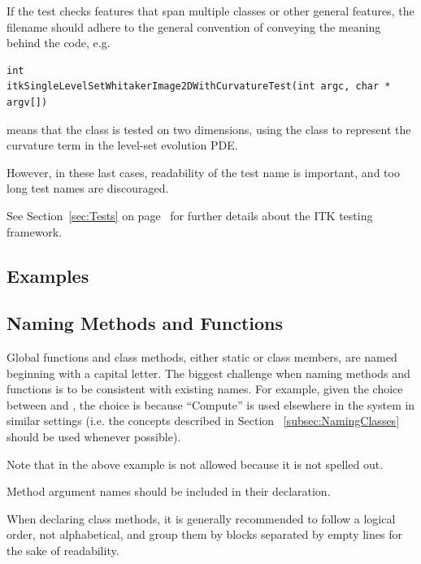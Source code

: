 If the test checks features that span multiple classes or other general
features, the filename should adhere to the general convention of conveying the
meaning behind the code, e.g.
\small
\begin{verbatim}
int
itkSingleLevelSetWhitakerImage2DWithCurvatureTest(int argc, char * argv[])
\end{verbatim}
\normalsize

means that the  class is tested on two
dimensions, using the  class to
represent the curvature term in the level-set evolution PDE.

However, in these last cases, readability of the test name is important, and too
long test names are discouraged.

See Section~\ref{sec:Tests} on page~\pageref{sec:Tests} for further details
about the ITK testing framework.


\subsection{Examples}%
\label{subsec:Examples}


\subsection{Naming Methods and Functions}%
\label{subsec:NamingMethodsAndFunctions}

Global functions and class methods, either static or class members, are named
beginning with a capital letter. The biggest challenge when naming methods and
functions is to be consistent with existing names. For example, given the choice
between  and , the
choice is   because ``Compute'' is used elsewhere in
the system in similar settings (i.e. the concepts described in Section
~\ref{subsec:NamingClasses} should be used whenever possible).

Note that in the above example  is not allowed because
it is not spelled out.

Method argument names should be included in their declaration.

When declaring class methods, it is generally recommended to follow a logical
order, not alphabetical, and group them by blocks separated by empty
lines for the sake of readability.

